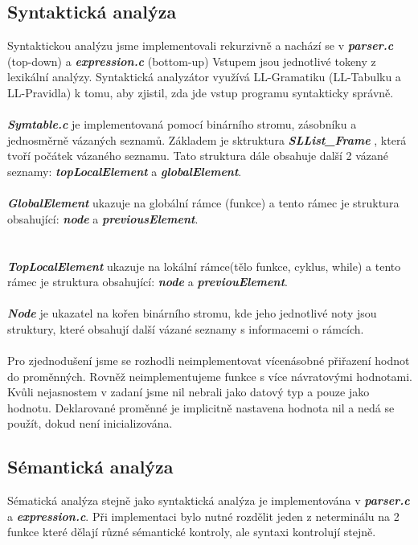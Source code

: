 \documentclass[12pt, letterpaper]{article}
\begin{document}
	\subsection{Syntaktická analýza}
    \large
    Syntaktickou analýzu jsme implementovali rekurzivně a nachází se v \textbf{\textit{parser.c}} (top-down) a \textbf{\textit{expression.c}} (bottom-up) Vstupem jsou jednotlivé tokeny z lexikální analýzy.
    Syntaktická analyzátor využívá LL-Gramatiku (LL-Tabulku a LL-Pravidla) k tomu, aby zjistil, zda jde vstup programu syntakticky správně.\\\\
    
    \textbf{\textit{Symtable.c}} je implementovaná pomocí binárního stromu, zásobníku a jednosměrně vázaných seznamů. Základem je sktruktura \textbf{\textit{SLList\_Frame}} , která tvoří počátek vázaného seznamu. Tato struktura dále obsahuje další 2 vázané seznamy: \textbf{\textit{topLocalElement}} a \textbf{\textit{globalElement}}.\\\\
    \textbf{\textit{GlobalElement}} ukazuje na globální rámce (funkce) a tento rámec je struktura obsahující: \textbf{\textit{node}} a \textbf{\textit{previousElement}}.\\\\\\
    \textbf{\textit{TopLocalElement}} ukazuje na lokální rámce(tělo funkce, cyklus, while) a tento rámec je struktura obsahující: \textbf{\textit{node}} a \textbf{\textit{previouElement}}.\\\\
     \textbf{\textit{Node}} je ukazatel na kořen binárního stromu, kde jeho jednotlivé noty jsou struktury, které obsahují další vázané seznamy s informacemi o rámcích. \\\\
     Pro zjednodušení jsme se rozhodli neimplementovat vícenásobné přiřazení hodnot do proměnných. Rovněž neimplementujeme funkce s více návratovými hodnotami. \\
     Kvůli nejasnostem v zadaní jsme nil nebrali jako datový typ a pouze jako hodnotu. Deklarované proměnné je implicitně nastavena hodnota nil a nedá se použít, dokud není inicializována.
    
	\subsection{Sémantická analýza}
    Sématická analýza stejně jako syntaktická analýza je implementována v \textbf{\textit{parser.c}} a \textbf{\textit{expression.c}}. Při implementaci bylo nutné rozdělit jeden z neterminálu na 2 funkce které dělají různé sémantické kontroly, ale syntaxi kontrolují stejně.
\end{document}
